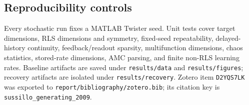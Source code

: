 \subsection{Reproducibility controls}
Every stochastic run fixes a MATLAB Twister seed. Unit tests cover target dimensions, RLS dimensions and symmetry, fixed-seed repeatability, delayed-history continuity, feedback/readout sparsity, multifunction dimensions, chaos statistics, stored-rate dimensions, AMC parsing, and finite non-RLS learning rates. Baseline artifacts are saved under \texttt{results/data} and \texttt{results/figures}; recovery artifacts are isolated under \texttt{results/recovery}. Zotero item \texttt{D2YQS7LK} was exported to \texttt{report/bibliography/zotero.bib}; its citation key is \texttt{sussillo\_generating\_2009}.

